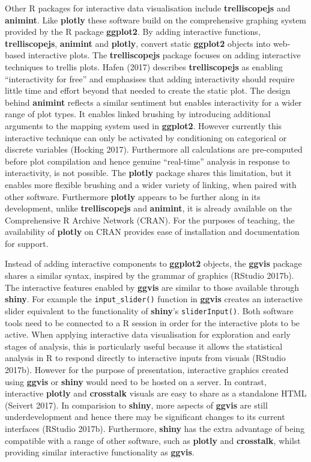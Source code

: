 \documentclass[]{book}
\theoremstyle{definition}
\theoremstyle{definition}
\theoremstyle{definition}
\theoremstyle{remark}
\begin{document}
Other R packages for interactive data visualisation include
\textbf{trelliscopejs} and \textbf{animint}. Like \textbf{plotly} these
software build on the comprehensive graphing system provided by the R
package \textbf{ggplot2}. By adding interactive functions,
\textbf{trelliscopejs}, \textbf{animint} and \textbf{plotly}, convert
static \textbf{ggplot2} objects into web-based interactive plots. The
\textbf{trelliscopejs} package focuses on adding interactive techniques
to trellis plots. Hafen (2017) describes \textbf{trelliscopejs} as
enabling ``interactivity for free'' and emphasises that adding
interactivity should require little time and effort beyond that needed
to create the static plot. The design behind \textbf{animint} reflects a
similar sentiment but enables interactivity for a wider range of plot
types. It enables linked brushing by introducing additional arguments to
the mapping system used in \textbf{ggplot2}. However currently this
interactive technique can only be activated by conditioning on
categorical or discrete variables (Hocking 2017). Furthermore all
calculations are pre-computed before plot compilation and hence genuine
``real-time'' analysis in response to interactivity, is not possible.
The \textbf{plotly} package shares this limitation, but it enables more
flexible brushing and a wider variety of linking, when paired with other
software. Furthermore \textbf{plotly} appears to be further along in its
development, unlike \textbf{trelliscopejs} and \textbf{animint}, it is
already available on the Comprehensive R Archive Network (CRAN). For the
purposes of teaching, the availability of \textbf{plotly} on CRAN
provides ease of installation and documentation for support.

Instead of adding interactive components to \textbf{ggplot2} objects,
the \textbf{ggvis} package shares a similar syntax, inspired by the
grammar of graphics (RStudio 2017b). The interactive features enabled by
\textbf{ggvis} are similar to those available through \textbf{shiny}.
For example the \texttt{input\_slider()} function in \textbf{ggvis}
creates an interactive slider equivalent to the functionality of
\textbf{shiny}'s \texttt{sliderInput()}. Both software tools need to be
connected to a R session in order for the interactive plots to be
active. When applying interactive data visualisation for exploration and
early stages of analysis, this is particularly useful because it allows
the statistical analysis in R to respond directly to interactive inputs
from visuals (RStudio 2017b). However for the purpose of presentation,
interactive graphics created using \textbf{ggvis} or \textbf{shiny}
would need to be hosted on a server. In contrast, interactive
\textbf{plotly} and \textbf{crosstalk} visuals are easy to share as a
standalone HTML (Seivert 2017). In comparision to \textbf{shiny}, more
aspects of \textbf{ggvis} are still underdevelopment and hence there may
be significant changes to its current interfaces (RStudio 2017b).
Furthermore, \textbf{shiny} has the extra advantage of being compatible
with a range of other software, such as \textbf{plotly} and
\textbf{crosstalk}, whilst providing similar interactive functionality
as \textbf{ggvis}.
\end{document}
